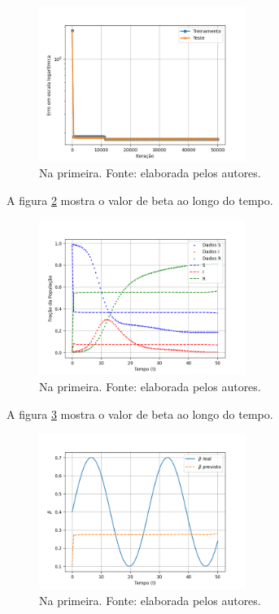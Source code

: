 \begin{figure}[htpb]
\centering
\includegraphics[width=0.6\textwidth]{figuras/loss-sir-nonoise.png}
\caption{Na primeira. Fonte: elaborada pelos autores.}
\label{fig:loss-sir-ruidoso}
\end{figure}


A figura \ref{fig:compartimentos-sir-ruidoso} mostra o valor de 
beta ao longo do tempo.

\begin{figure}[htpb]
\centering
\includegraphics[width=0.6\textwidth]{figuras/predicted-compartments-sir-nonoise.png}
\caption{Na primeira. Fonte: elaborada pelos autores.}
\label{fig:compartimentos-sir-ruidoso}
\end{figure}

A figura \ref{fig:beta-sir-ruidoso} mostra o valor de beta ao longo do tempo.

\begin{figure}[htpb]
\centering
\includegraphics[width=0.6\textwidth]{figuras/predicted-beta-sir-nonoise.png}
\caption{Na primeira. Fonte: elaborada pelos autores.}
\label{fig:beta-sir-ruidoso}
\end{figure}


